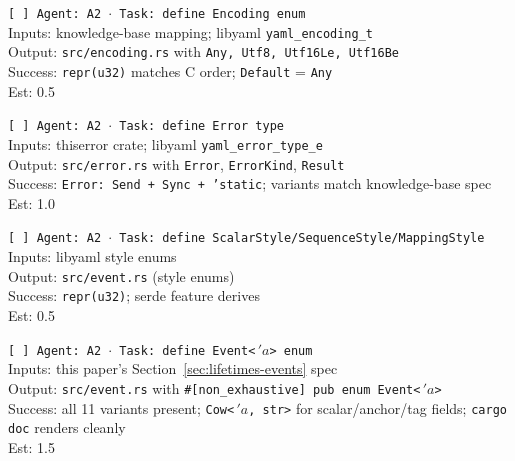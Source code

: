 \documentclass[12pt]{article}
\theoremstyle{definition}
\theoremstyle{remark}
\newcommand{\lifetime}[1]{\ensuremath{\,'\!#1}}
\begin{document}
\begin{small}
\noindent\texttt{[ ] Agent: A2 $\cdot$ Task: define Encoding enum}\\
\hspace*{2em}Inputs: knowledge-base mapping; libyaml \texttt{yaml\_encoding\_t}\\
\hspace*{2em}Output: \texttt{src/encoding.rs} with \texttt{Any, Utf8, Utf16Le, Utf16Be}\\
\hspace*{2em}Success: \texttt{repr(u32)} matches C order; \texttt{Default} = \texttt{Any}\\
\hspace*{2em}Est: 0.5

\noindent\texttt{[ ] Agent: A2 $\cdot$ Task: define Error type}\\
\hspace*{2em}Inputs: thiserror crate; libyaml \texttt{yaml\_error\_type\_e}\\
\hspace*{2em}Output: \texttt{src/error.rs} with \texttt{Error}, \texttt{ErrorKind}, \texttt{Result}\\
\hspace*{2em}Success: \texttt{Error: Send + Sync + 'static}; variants match knowledge-base spec\\
\hspace*{2em}Est: 1.0

\noindent\texttt{[ ] Agent: A2 $\cdot$ Task: define ScalarStyle/SequenceStyle/MappingStyle}\\
\hspace*{2em}Inputs: libyaml style enums\\
\hspace*{2em}Output: \texttt{src/event.rs} (style enums)\\
\hspace*{2em}Success: \texttt{repr(u32)}; serde feature derives\\
\hspace*{2em}Est: 0.5

\noindent\texttt{[ ] Agent: A2 $\cdot$ Task: define Event<\lifetime{a}> enum}\\
\hspace*{2em}Inputs: this paper's Section~\ref{sec:lifetimes-events} spec\\
\hspace*{2em}Output: \texttt{src/event.rs} with \texttt{\#[non\_exhaustive] pub enum Event<\lifetime{a}>}\\
\hspace*{2em}Success: all 11 variants present; \texttt{Cow<\lifetime{a}, str>} for scalar/anchor/tag fields; \texttt{cargo doc} renders cleanly\\
\hspace*{2em}Est: 1.5


\end{small}
\end{document}
